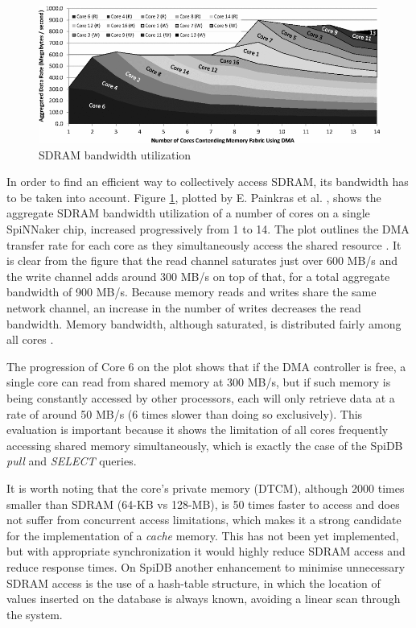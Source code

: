 \begin{figure}
\begin{center}
	\includegraphics[width=1.3\textwidth, natwidth=820, natheight=329]{images/sdram_bandwidth.png}
\end{center}
\caption{SDRAM bandwidth utilization \cite{painkras}}
\label{fig:sdram_bandwidth}
\end{figure}

In order to find an efficient way to collectively access SDRAM, its bandwidth has to be taken into account. Figure \ref{fig:sdram_bandwidth}, plotted by E. Painkras et al. \cite{painkras}, shows the aggregate SDRAM bandwidth utilization of a number of cores on a single SpiNNaker chip, increased progressively from 1 to 14. The plot outlines the DMA transfer rate for each core as they simultaneously access the shared resource \cite{multicoresystem}. It is clear from the figure that the read channel saturates just over 600 MB/s and the write channel adds around 300 MB/s on top of that, for a total aggregate bandwidth of 900 MB/s. Because memory reads and writes share the same network channel, an increase in the number of writes decreases the read bandwidth. Memory bandwidth, although saturated, is distributed fairly among all cores \cite{painkras}. 

The progression of Core 6 on the plot shows that if the DMA controller is free, a single core can read from shared memory at 300 MB/s, but if such memory is being constantly accessed by other processors, each will only retrieve data at a rate of around 50 MB/s (6 times slower than doing so exclusively). This evaluation is important because it shows the limitation of all cores frequently accessing shared memory simultaneously, which is exactly the case of the SpiDB \textit{pull} and \textit{SELECT} queries.

It is worth noting that the core's private memory (DTCM), although 2000 times smaller than SDRAM (64-KB vs 128-MB), is 50 times faster to access and does not suffer from concurrent access limitations, which makes it a strong candidate for the implementation of a \textit{cache} memory. This has not been yet implemented, but with appropriate synchronization it would highly reduce SDRAM access and reduce response times. On SpiDB another enhancement to minimise unnecessary SDRAM access is the use of a hash-table structure, in which the location of values inserted on the database is always known, avoiding a linear scan through the system.
